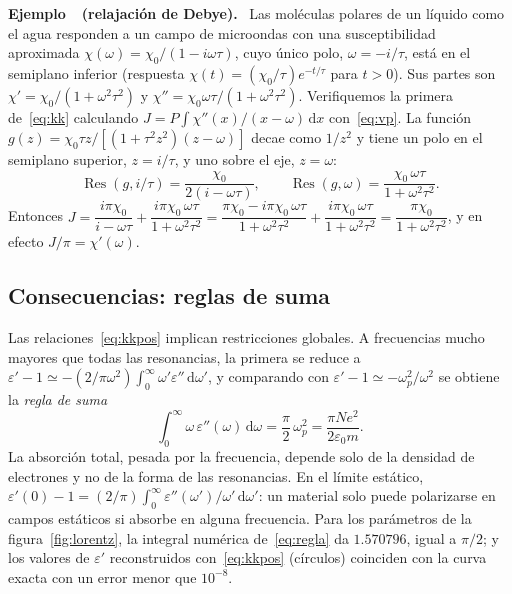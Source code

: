 \documentclass[11pt,letterpaper]{article}
\newcounter{ejemplo}
\newenvironment{ejemplo}[1]{%
  \refstepcounter{ejemplo}%
  \begin{ejemplobox}\textbf{Ejemplo~\theejemplo\ (#1).}\ }%
  {\end{ejemplobox}}
\newcommand{\dd}{\mathrm{d}}
\newcommand{\eps}{\varepsilon}
\DeclareMathOperator{\Res}{Res}
\newcommand{\vp}{P}   %
\begin{document}
\begin{ejemplo}{relajación de Debye}
Las moléculas polares de un líquido como el agua responden a un campo de
microondas con una susceptibilidad aproximada $\chi(\omega)=\chi_0/(1-i\omega\tau)$,
cuyo único polo, $\omega=-i/\tau$, está en el semiplano inferior (respuesta
$\chi(t)=(\chi_0/\tau)e^{-t/\tau}$ para $t>0$). Sus partes son
$\chi'=\chi_0/(1+\omega^2\tau^2)$ y $\chi''=\chi_0\omega\tau/(1+\omega^2\tau^2)$.
Verifiquemos la primera de~\eqref{eq:kk} calculando
$J=\vp\!\int\chi''(x)/(x-\omega)\,\dd x$ con~\eqref{eq:vp}. La función
$g(z)=\chi_0\tau z/[(1+\tau^2z^2)(z-\omega)]$ decae como $1/z^2$ y tiene un
polo en el semiplano superior, $z=i/\tau$, y uno sobre el eje, $z=\omega$:
\[
  \Res(g,i/\tau)=\frac{\chi_0}{2(i-\omega\tau)},\qquad
  \Res(g,\omega)=\frac{\chi_0\,\omega\tau}{1+\omega^2\tau^2}.
\]
Entonces
$J=\dfrac{i\pi\chi_0}{i-\omega\tau}+\dfrac{i\pi\chi_0\,\omega\tau}{1+\omega^2\tau^2}
=\dfrac{\pi\chi_0-i\pi\chi_0\,\omega\tau}{1+\omega^2\tau^2}
+\dfrac{i\pi\chi_0\,\omega\tau}{1+\omega^2\tau^2}
=\dfrac{\pi\chi_0}{1+\omega^2\tau^2}$, y en efecto $J/\pi=\chi'(\omega)$.
\end{ejemplo}

\subsection{Consecuencias: reglas de suma}

Las relaciones~\eqref{eq:kkpos} implican restricciones globales. A frecuencias
mucho mayores que todas las resonancias, la primera se reduce a
$\eps'-1\simeq-(2/\pi\omega^2)\int_0^\infty\omega'\eps''\,\dd\omega'$, y
comparando con $\eps'-1\simeq-\omega_p^2/\omega^2$ se obtiene la \emph{regla
de suma}
\begin{equation}\label{eq:regla}
  \int_0^\infty\omega\,\eps''(\omega)\,\dd\omega
  =\frac{\pi}{2}\,\omega_p^2=\frac{\pi Ne^2}{2\eps_0 m}.
\end{equation}
La absorción total, pesada por la frecuencia, depende solo de la densidad de
electrones y no de la forma de las resonancias. En el límite estático,
$\eps'(0)-1=(2/\pi)\int_0^\infty\eps''(\omega')/\omega'\,\dd\omega'$: un
material solo puede polarizarse en campos estáticos si absorbe en alguna
frecuencia. Para los parámetros de la figura~\ref{fig:lorentz}, la integral
numérica de~\eqref{eq:regla} da $1.570796$, igual a $\pi/2$; y los valores de
$\eps'$ reconstruidos con~\eqref{eq:kkpos} (círculos) coinciden con la curva
exacta con un error menor que $10^{-8}$.
\end{document}
